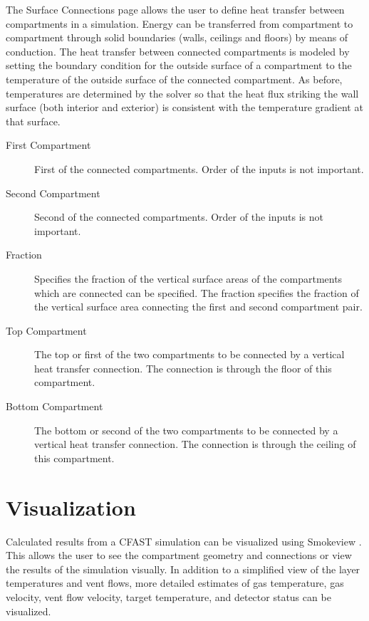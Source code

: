 The Surface Connections page allows the user to define heat transfer between compartments in a simulation. Energy can be transferred from compartment to compartment through solid boundaries (walls, ceilings and floors) by means of conduction. The heat transfer between connected compartments is modeled by setting the boundary condition for the outside surface of a compartment to the temperature of the outside surface of the  connected compartment.   As before, temperatures are determined by the solver so that the heat flux striking the wall surface (both interior and exterior) is consistent with the temperature gradient at that surface.

\begin{description}
\item[First Compartment] First of the connected compartments. Order of the inputs is not important.

\item[Second Compartment] Second of the connected compartments. Order of the inputs is not important.

\item[Fraction] Specifies the fraction of the vertical surface areas of the compartments which are connected can be specified. The fraction specifies the fraction of the vertical surface area connecting the first and second compartment pair.

\item[Top Compartment] The top or first of the two compartments to be connected by a vertical heat transfer connection. The connection is through the floor of this compartment.

\item[Bottom Compartment] The bottom or second of the two compartments to be connected by a vertical heat transfer connection. The connection is through the ceiling of this compartment.
\end{description}


\chapter{Visualization}

Calculated results from a CFAST simulation can be visualized using Smokeview \cite{Smokeview_Users_Guide_6}. This allows the user to see the compartment geometry and connections or view the results of the simulation visually. In addition to a simplified view of the layer temperatures and vent flows, more detailed estimates of gas temperature, gas velocity, vent flow velocity, target temperature, and detector status can be visualized.

